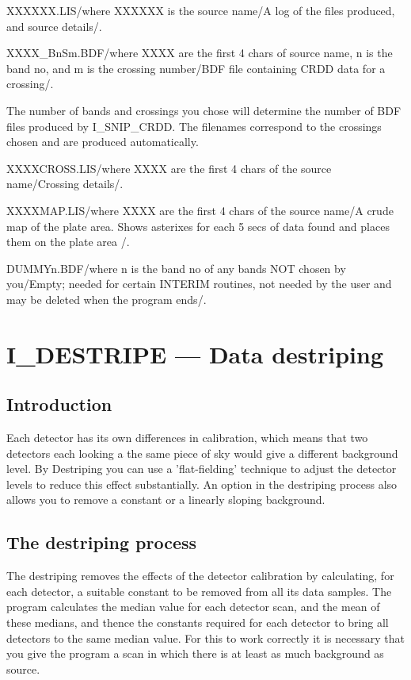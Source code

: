 \tfile XXXXXX.LIS/where XXXXXX is the source name/A log of the files
produced, and source details/.

\tfile XXXX\_BnSm.BDF/where XXXX are the first 4 chars of source name, 
n is the band no, and m is the crossing number/BDF file containing
CRDD data for a crossing/.

The number of bands and crossings you chose will determine the number of BDF 
files  produced by I\_SNIP\_CRDD. The filenames correspond to the crossings
chosen and are produced automatically.                
               
\tfile XXXXCROSS.LIS/where XXXX are the first 4 chars of the
source name/Crossing details/. 

\tfile XXXXMAP.LIS/where XXXX are the first 4 chars of the source name/A crude 
map of the plate area.\hfill\break
Shows asterixes for each 5 secs of data found and places them on the plate
area\hfill\break
/.

\tfile DUMMYn.BDF/where n is the band no of any bands NOT chosen by you/Empty;
needed for certain INTERIM routines, not needed by the user and may be 
deleted when the program ends/.


\pagebreak
\section {I\_DESTRIPE --- Data destriping}

\subsection {Introduction}

Each detector has its own differences in calibration, which means that two
detectors each looking a the same piece of sky would give a different background
level. By Destriping you can use a 'flat-fielding' technique  to adjust the
detector levels to reduce this effect substantially. An option in the
destriping process also allows you to remove a constant or a linearly sloping
background.

\subsection {The destriping process}

The destriping removes the effects of the detector calibration by calculating,
for each detector, a suitable constant to be removed from all its data samples.
The program calculates the median value for each detector scan, and the mean of
these medians, and thence the constants required for each detector to bring all
detectors to the same median value. For this to work correctly it is necessary 
that you give the program a scan in which there is at least as much background 
as source.

